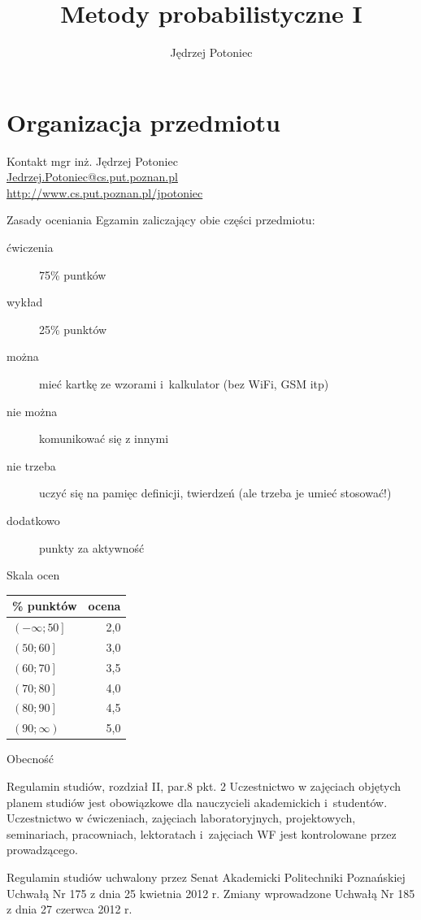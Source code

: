 \documentclass{beamer}
\title{Metody probabilistyczne I}
\author{Jędrzej Potoniec}
\date{}
\begin{document}
\begin{frame}
\titlepage
\end{frame}
\part{Organizacja przedmiotu}
\frame{\partpage}
\begin{frame}{Kontakt}
mgr inż. Jędrzej Potoniec \\
\url{Jedrzej.Potoniec@cs.put.poznan.pl}\\
\url{http://www.cs.put.poznan.pl/jpotoniec}
\end{frame}
\begin{frame}{Zasady oceniania}
Egzamin zaliczający obie części przedmiotu:
\begin{description}
\item[ćwiczenia] 75\% puntków
\item[wykład] 25\% punktów
\item[można] mieć kartkę ze wzorami i~kalkulator (bez WiFi, GSM itp)
\item[nie można] komunikować się z innymi
\item[nie trzeba] uczyć się na pamięc definicji, twierdzeń (ale trzeba je umieć stosować!)
\item[dodatkowo] punkty za aktywność
\end{description}
\end{frame}
\begin{frame}{Skala ocen}
\begin{center}
\begin{tabular}{l|r}
\% punktów & ocena \\
\hline
$\left(-\infty; 50\right]$ & 2,0 \\
$\left(50; 60\right]$ & 3,0 \\
$\left(60; 70\right]$ & 3,5 \\
$\left(70; 80\right]$ & 4,0 \\
$\left(80; 90\right]$ & 4,5 \\
$\left(90; \infty\right)$ & 5,0 \\
\end{tabular}
\end{center}
\end{frame}
\begin{frame}{Obecność}
\begin{block}{Regulamin studiów, rozdział II, par.8 pkt. 2}
Uczestnictwo w zajęciach objętych planem studiów jest obowiązkowe dla nauczycieli akademickich i~studentów.
Uczestnictwo w ćwiczeniach, zajęciach laboratoryjnych, projektowych, seminariach, pracowniach, lektoratach i~zajęciach WF jest kontrolowane przez prowadzącego.
\end{block}
{\tiny Regulamin studiów uchwalony przez Senat Akademicki Politechniki Poznańskiej Uchwałą Nr 175 z dnia 25 kwietnia 2012 r. Zmiany wprowadzone Uchwałą Nr 185 z dnia 27 czerwca 2012 r.}
\end{frame}
\end{document}
